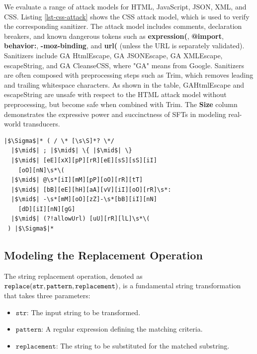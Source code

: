 We evaluate a range of attack models for HTML, JavaScript, JSON, XML, and CSS. Listing \ref{lst-css-attack} shows the CSS attack model, which is used to verify the corresponding sanitizer. The attack model includes comments, declaration breakers, and known dangerous tokens such as \textbf{expression(}, \textbf{@import}, \textbf{behavior:}, \textbf{-moz-binding}, and \textbf{url(} (unless the URL is separately validated). Sanitizers include GA HtmlEscape, GA JSONEscape, GA XMLEscape, escapeString, and GA CleanseCSS, where "GA" means from Google. Sanitizers are often composed with preprocessing steps such as Trim, which removes leading and trailing whitespace characters. As shown in the table, GAHtmlEscape and escapeString are unsafe with respect to the HTML attack model without preprocessing, but become safe when combined with Trim. The \textbf{Size} column demonstrates the expressive power and succinctness of SFTs in modeling real-world transducers.




\begin{lstlisting}[language={}, caption={CSS attack model for sanitizer verification.}, label={lst-css-attack}, float=htbp]
|$\Sigma$|* ( / \* [\s\S]*? \*/
  |$\mid$| ; |$\mid$| \{ |$\mid$| \}
  |$\mid$| [eE][xX][pP][rR][eE][sS][sS][iI]
    [oO][nN]\s*\(
  |$\mid$| @\s*[iI][mM][pP][oO][rR][tT]
  |$\mid$| [bB][eE][hH][aA][vV][iI][oO][rR]\s*:
  |$\mid$| -\s*[mM][oO][zZ]-\s*[bB][iI][nN]
    [dD][iI][nN][gG]
  |$\mid$| (?!allowUrl) [uU][rR][lL]\s*\(
 ) |$\Sigma$|*
\end{lstlisting}

\subsection{Modeling the Replacement Operation}

The string replacement operation, denoted as
$\texttt{replace}(\texttt{str}, \newline\texttt{pattern}, \texttt{replacement})$, is a fundamental string transformation that takes three parameters:
\begin{itemize}
  \item $\texttt{str}$: The input string to be transformed.
  \item $\texttt{pattern}$: A regular expression defining the matching criteria.
  \item $\texttt{replacement}$: The string to be substituted for the matched substring.
\end{itemize}

